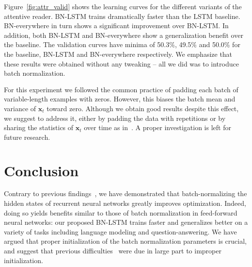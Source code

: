 \documentclass{article} %
\newcommand{\vect}[1]{\mathbf{#1}}
\begin{document}
Figure~\ref{fig:attr_valid} shows the learning curves for the different variants of the attentive reader.
BN-LSTM trains dramatically faster than the LSTM baseline.
BN-everywhere in turn shows a significant improvement over BN-LSTM.
In addition, both BN-LSTM and BN-everywhere show a generalization benefit over the baseline.
The validation curves have minima of 50.3\%, 49.5\% and 50.0\% for the baseline, BN-LSTM and BN-everywhere respectively.
We emphasize that these results were obtained without any tweaking -- all we did was to introduce batch normalization.

For this experiment we followed the common practice of padding each batch of variable-length examples with zeros.
However, this biases the batch mean and variance of $\vect{x}_t$ toward zero.
Although we obtain good results despite this effect, we suggest to address it, either by padding the data with repetitions or by sharing the statistics of $\vect{x}_t$ over time as in~\cite{cesar}.
A proper investigation is left for future research.

\section{Conclusion}

Contrary to previous findings~\cite{cesar,baidu},
we have demonstrated that batch-normalizing the hidden states of recurrent neural networks greatly improves optimization.
Indeed, doing so yields benefits similar to those of batch normalization in feed-forward neural networks:
our proposed BN-LSTM trains faster and generalizes better on a variety of tasks including language modeling and question-answering.
We have argued that proper initialization of the batch normalization parameters is crucial,
and suggest that previous difficulties~\cite{cesar, baidu} were due in large part to improper initialization.





\end{document}

